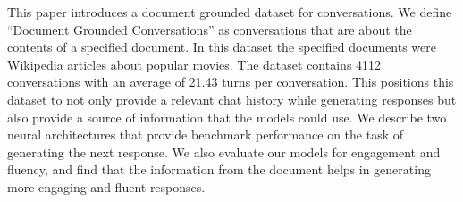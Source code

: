 This paper introduces a document grounded dataset for conversations. We define ``Document Grounded Conversations'' as conversations that are about the contents of a specified document. In this dataset the specified documents were Wikipedia articles about popular movies. The dataset contains 4112 conversations with an average of 21.43 turns per conversation. This positions this dataset to not only provide a relevant chat history while generating responses but also provide a source of information that the models could use. We describe two neural architectures that provide benchmark performance on the task of generating the next response. We also evaluate our models for engagement and fluency, and find that the information from the document helps in generating more engaging and fluent responses.
